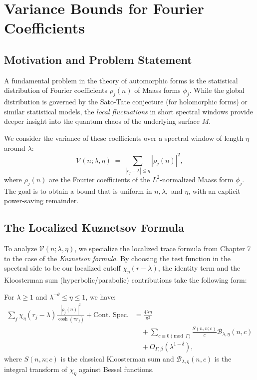 
\section{Variance Bounds for Fourier Coefficients}\label{sec:variance}

\subsection{Motivation and Problem Statement}

A fundamental problem in the theory of automorphic forms is the statistical distribution of Fourier coefficients $\rho_j(n)$ of Maass forms $\phi_j$. While the global distribution is governed by the Sato-Tate conjecture (for holomorphic forms) or similar statistical models, the \emph{local fluctuations} in short spectral windows provide deeper insight into the quantum chaos of the underlying surface $M$.

We consider the variance of these coefficients over a spectral window of length $\eta$ around $\lambda$:
\begin{equation}\label{eq:var-def}
\mathcal{V}(n; \lambda, \eta) \;=\; \sum_{|r_j - \lambda| \le \eta} |\rho_j(n)|^2,
\end{equation}
where $\rho_j(n)$ are the Fourier coefficients of the $L^2$-normalized Maass form $\phi_j$. The goal is to obtain a bound that is uniform in $n, \lambda,$ and $\eta$, with an explicit power-saving remainder.

\subsection{The Localized Kuznetsov Formula}

To analyze $\mathcal{V}(n; \lambda, \eta)$, we specialize the localized trace formula from Chapter 7 to the case of the \emph{Kuznetsov formula}. By choosing the test function in the spectral side to be our localized cutoff $\chi_\eta(r-\lambda)$, the identity term and the Kloosterman sum (hyperbolic/parabolic) contributions take the following form:

\begin{theorem}\label{thm:kuznetsov-var}
For $\lambda \ge 1$ and $\lambda^{-\theta} \le \eta \le 1$, we have:
\begin{align}\label{eq:kuznetsov-ident}
\sum_{j} \chi_\eta(r_j - \lambda) \frac{|\rho_j(n)|^2}{\cosh(\pi r_j)} 
+ \text{Cont. Spec.} &= \frac{4\lambda \eta}{\pi^2} \\
&\quad + \sum_{c \equiv 0 \pmod \Gamma} \frac{S(n, n; c)}{c} \mathcal{B}_{\lambda, \eta}(n, c) \nonumber \\
&\quad + O_{\Gamma, \beta}(\lambda^{1-\delta}), \nonumber
\end{align}
where $S(n, n; c)$ is the classical Kloosterman sum and $\mathcal{B}_{\lambda, \eta}(n, c)$ is the integral transform of $\chi_\eta$ against Bessel functions.
\end{theorem}

